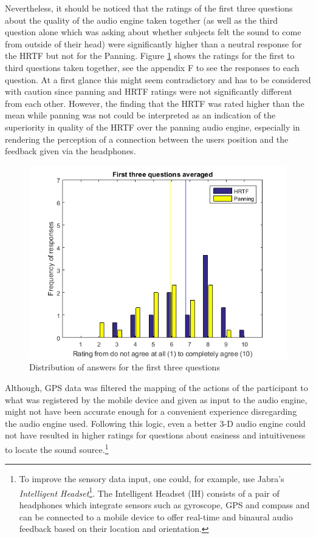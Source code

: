 \documentclass[journal]{IEEEtran}
\begin{document}
Nevertheless, it should be noticed that the ratings of the first three questions about the quality of the audio engine taken together (as well as the third question alone which was asking about whether subjects felt the sound to come from outside of their head) were significantly higher than a neutral response for the HRTF but not for the Panning. Figure \ref{fig:histqq13} shows the ratings for the first to third questions taken together, see the appendix F to see the responses to each question. At a first glance this might seem contradictory and has to be considered with caution since panning and HRTF ratings were not significantly different from each other. However, the finding that the HRTF was rated higher than the mean while panning was not could be interpreted as an indication of the superiority in quality of the HRTF over the panning audio engine, especially in rendering the perception of a connection between the users position and the feedback given via the headphones. 

\begin{figure}[h!]
\centering
\includegraphics[scale=0.7]{graphics/qq13.png}
\caption{Distribution of answers for the first three questions}
\label{fig:histqq13}
\end{figure}

Although, GPS data was filtered the mapping of the actions of the participant to what was registered by the mobile device and given as input to the audio engine, might not have been accurate enough for a convenient experience disregarding the audio engine used. Following this logic, even a better 3-D audio engine could not have resulted in higher ratings for questions about easiness and intuitiveness to locate the sound source.\footnote{ To improve the sensory data input, one could, for example, use Jabra's \emph{Intelligent Headset}\footnote{https://intelligentheadset.com/}. The Intelligent Headset (IH) consists of a pair of headphones which integrate sensors such as gyroscope, GPS and compass and can be connected to a mobile device to offer real-time and binaural audio feedback based on their location and orientation.}
\end{document}
